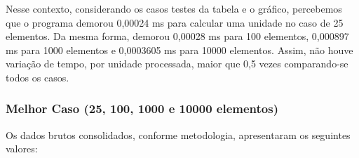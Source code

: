 \documentclass[a4paper, 12pt]{article}
\begin{document}
\begin{minipage}{1.0\textwidth}
\begin{minipage}[c]{0.49\textwidth}
  \end{minipage}
 \hfill
 \begin{minipage}[c]{0.49\textwidth}
 \centering
{}
\end{minipage}
\end{minipage}


\vspace{0.8cm}
Nesse contexto, considerando os casos testes da tabela e o gráfico, percebemos que o programa demorou 0,00024 ms para calcular uma unidade no caso de 25 elementos. Da mesma forma, demorou 0,00028 ms para 100 elementos, 0,000897 ms para 1000 elementos e 0,0003605 ms para 10000 elementos. Assim, não houve variação de tempo, por unidade processada, maior que 0,5 vezes comparando-se todos os casos.


\subsubsection{Melhor Caso (25, 100, 1000 e 10000 elementos)}
\tab{ }Os dados brutos consolidados, conforme metodologia, apresentaram os seguintes valores:
\vspace{0.2cm}
\end{document}
